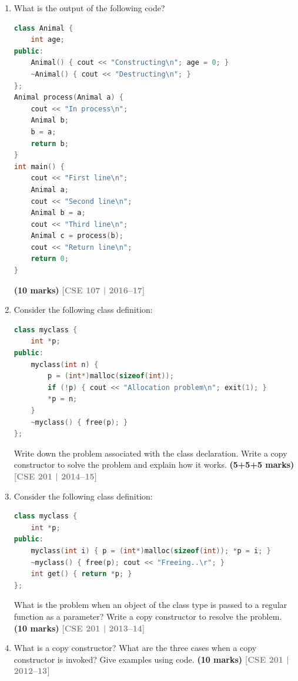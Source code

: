 \documentclass[12pt,a3paper]{article}
\newcommand{\yr}[1]{\hfill\textcolor{gray}{\small\textbf{[#1]}}}
\newcommand{\mk}[1]{\textcolor{orange!70!black}{\small\textbf{(#1 marks)}}}
\begin{document}
\begin{enumerate}



\item What is the output of the following code?
\begin{lstlisting}[language=C++]
class Animal {
    int age;
public:
    Animal() { cout << "Constructing\n"; age = 0; }
    ~Animal() { cout << "Destructing\n"; }
};
Animal process(Animal a) {
    cout << "In process\n";
    Animal b;
    b = a;
    return b;
}
int main() {
    cout << "First line\n";
    Animal a;
    cout << "Second line\n";
    Animal b = a;
    cout << "Third line\n";
    Animal c = process(b);
    cout << "Return line\n";
    return 0;
}
\end{lstlisting}
\mk{10}
\yr{CSE 107 | 2016--17}




\item Consider the following class definition:
\begin{lstlisting}[language=C++]
class myclass {
    int *p;
public:
    myclass(int n) {
        p = (int*)malloc(sizeof(int));
        if (!p) { cout << "Allocation problem\n"; exit(1); }
        *p = n;
    }
    ~myclass() { free(p); }
};
\end{lstlisting}
Write down the problem associated with the class declaration. Write a copy constructor to solve the problem and explain how it works. \mk{5+5+5}
\yr{CSE 201 | 2014--15}


\item Consider the following class definition:
\begin{lstlisting}[language=C++]
class myclass {
    int *p;
public:
    myclass(int i) { p = (int*)malloc(sizeof(int)); *p = i; }
    ~myclass() { free(p); cout << "Freeing..\r"; }
    int get() { return *p; }
};
\end{lstlisting}
What is the problem when an object of the class type is passed to a regular function as a parameter? Write a copy constructor to resolve the problem. \mk{10}
\yr{CSE 201 | 2013--14}




\item What is a copy constructor? What are the three cases when a copy constructor is invoked? Give examples using code. \mk{10}
\yr{CSE 201 | 2012--13}



\end{enumerate}
\end{document}
